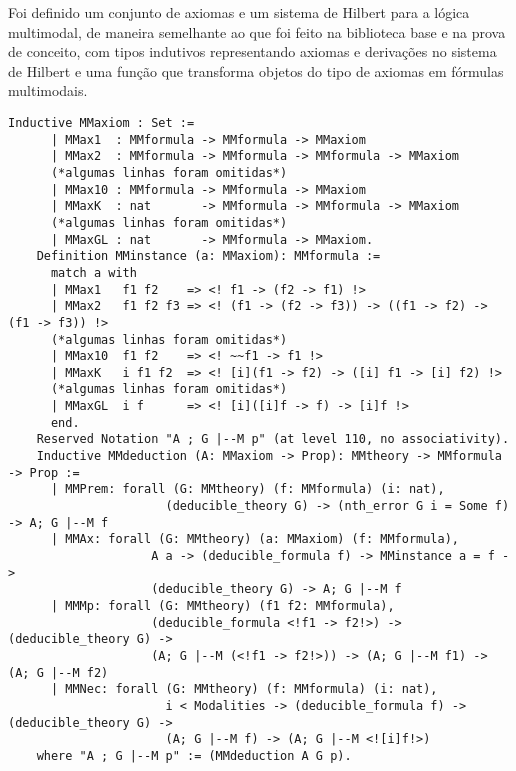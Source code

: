       Foi definido um conjunto de axiomas e um sistema de Hilbert para a lógica multimodal, de maneira semelhante ao que foi feito na biblioteca base e na prova de conceito,
      com tipos indutivos representando axiomas e derivações no sistema de Hilbert e uma função que transforma objetos do tipo de axiomas em fórmulas multimodais.
      \begin{lstlisting}[language=coq]
    Inductive MMaxiom : Set :=
      | MMax1  : MMformula -> MMformula -> MMaxiom
      | MMax2  : MMformula -> MMformula -> MMformula -> MMaxiom
      (*algumas linhas foram omitidas*)
      | MMax10 : MMformula -> MMformula -> MMaxiom
      | MMaxK  : nat       -> MMformula -> MMformula -> MMaxiom
      (*algumas linhas foram omitidas*)
      | MMaxGL : nat       -> MMformula -> MMaxiom.
    Definition MMinstance (a: MMaxiom): MMformula :=
      match a with
      | MMax1   f1 f2    => <! f1 -> (f2 -> f1) !>
      | MMax2   f1 f2 f3 => <! (f1 -> (f2 -> f3)) -> ((f1 -> f2) -> (f1 -> f3)) !>
      (*algumas linhas foram omitidas*)
      | MMax10  f1 f2    => <! ~~f1 -> f1 !>
      | MMaxK   i f1 f2  => <! [i](f1 -> f2) -> ([i] f1 -> [i] f2) !>
      (*algumas linhas foram omitidas*)
      | MMaxGL  i f      => <! [i]([i]f -> f) -> [i]f !>
      end.
    Reserved Notation "A ; G |--M p" (at level 110, no associativity).
    Inductive MMdeduction (A: MMaxiom -> Prop): MMtheory -> MMformula -> Prop :=
      | MMPrem: forall (G: MMtheory) (f: MMformula) (i: nat),
                      (deducible_theory G) -> (nth_error G i = Some f) -> A; G |--M f
      | MMAx: forall (G: MMtheory) (a: MMaxiom) (f: MMformula),
                    A a -> (deducible_formula f) -> MMinstance a = f ->
                    (deducible_theory G) -> A; G |--M f
      | MMMp: forall (G: MMtheory) (f1 f2: MMformula),
                    (deducible_formula <!f1 -> f2!>) -> (deducible_theory G) ->
                    (A; G |--M (<!f1 -> f2!>)) -> (A; G |--M f1) -> (A; G |--M f2)
      | MMNec: forall (G: MMtheory) (f: MMformula) (i: nat),
                      i < Modalities -> (deducible_formula f) -> (deducible_theory G) ->
                      (A; G |--M f) -> (A; G |--M <![i]f!>)
    where "A ; G |--M p" := (MMdeduction A G p).
      \end{lstlisting}

